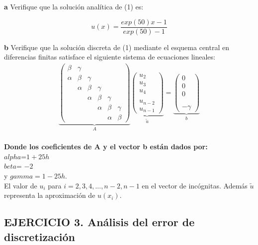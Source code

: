 \documentclass[paper=a4, parskip=full, fontsize=12pt]{scrartcl} %
\numberwithin{equation}{section} %
\numberwithin{figure}{section} %
\numberwithin{table}{section} %
\begin{document}
\textbf{a} Verifique que la soluci\'on anal\'itica de (1) es:

\[u(x)=\frac { exp(50)x -1}{ exp(50)-1}\]


\textbf{b} Verifique que la soluci\'on discreta de (1) mediante el esquema central en diferencias finitas satisface el siguiente sistema de ecuaciones lineales:\\
\[\begin{matrix}
\underbrace { \begin{pmatrix} \beta  & \gamma  &  &  &  &  \\ \alpha  & \beta  & \gamma  &  &  &  \\  & \alpha  & \beta  & \gamma  &  &  \\  &  & \alpha  & \beta  & \gamma  &  \\  &  &  & \alpha  & \beta  & \gamma  \\  &  &  &  & \alpha  & \beta  \end{pmatrix} }_{ A } \underbrace { \begin{pmatrix} { u }_{ 2 } \\ { u }_{ 3 } \\ { u }_{ 4 } \\  \\ { u }_{ n-2 } \\ { u }_{ n-1 } \end{pmatrix} }_{ \tilde { u }  } =\underbrace { \begin{pmatrix} 0 \\ 0 \\ 0 \\  \\  \\ -\gamma  \end{pmatrix} }_{ b } 
\end{matrix}\]\\

\textbf{Donde los coeficientes de A y el vector b est\'an dados por:}\\
$alpha$=$1+25h$\\$beta$= $-2$ \\ y $gamma=1-25h$. \\ El valor de $u_i$ para $i=2,3,4,...,n-2,n-1$ en el vector de inc\'ognitas. Adem\'as $\tilde { u }$ representa la aproximaci\'on de $u(x_i)$. 

\subsection{EJERCICIO 3. An\'alisis del error de discretizaci\'on}
\end{document}
